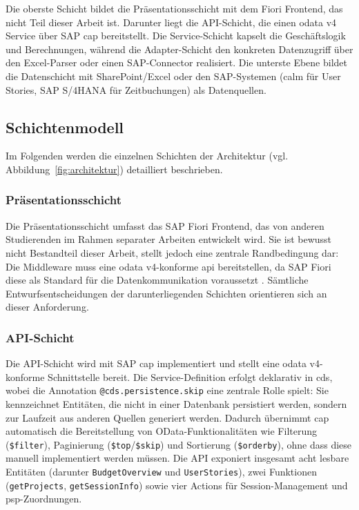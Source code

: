 Die oberste Schicht bildet die Präsentationsschicht mit dem Fiori Frontend, das nicht Teil dieser Arbeit ist. Darunter liegt die API-Schicht, die einen \gls{odata} v4 Service über SAP \gls{cap} bereitstellt. Die Service-Schicht kapselt die Geschäftslogik und Berechnungen, während die Adapter-Schicht den konkreten Datenzugriff über den Excel-Parser oder einen SAP-Connector realisiert. Die unterste Ebene bildet die Datenschicht mit SharePoint/Excel oder den SAP-Systemen (\gls{calm} für User Stories, SAP S/4HANA für Zeitbuchungen) als Datenquellen.

\subsection{Schichtenmodell}

Im Folgenden werden die einzelnen Schichten der Architektur (vgl. Abbildung~\ref{fig:architektur}) detailliert beschrieben.

\subsubsection{Präsentationsschicht}

Die Präsentationsschicht umfasst das SAP Fiori Frontend, das von anderen Studierenden im Rahmen separater Arbeiten entwickelt wird. Sie ist bewusst nicht Bestandteil dieser Arbeit, stellt jedoch eine zentrale Randbedingung dar: Die Middleware muss eine \gls{odata} v4-konforme \gls{api} bereitstellen, da SAP Fiori diese als Standard für die Datenkommunikation voraussetzt \citep{sap2024cap}. Sämtliche Entwurfsentscheidungen der darunterliegenden Schichten orientieren sich an dieser Anforderung.

\subsubsection{API-Schicht}

Die API-Schicht wird mit SAP \gls{cap} implementiert und stellt eine \gls{odata} v4-konforme Schnittstelle bereit. Die Service-Definition erfolgt deklarativ in \gls{cds}, wobei die Annotation \texttt{@cds.persistence.skip} eine zentrale Rolle spielt: Sie kennzeichnet Entitäten, die nicht in einer Datenbank persistiert werden, sondern zur Laufzeit aus anderen Quellen generiert werden. Dadurch übernimmt \gls{cap} automatisch die Bereitstellung von OData-Funktionalitäten wie Filterung (\texttt{\$filter}), Paginierung (\texttt{\$top}/\texttt{\$skip}) und Sortierung (\texttt{\$orderby}), ohne dass diese manuell implementiert werden müssen. Die API exponiert insgesamt acht lesbare Entitäten (darunter \texttt{BudgetOverview} und \texttt{UserStories}), zwei Funktionen (\texttt{getProjects}, \texttt{getSessionInfo}) sowie vier Actions für Session-Management und \gls{psp}-Zuordnungen.

